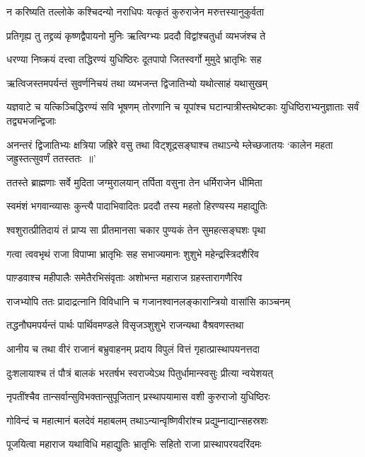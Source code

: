 \twolineshloka
{न करिष्यति तल्लोके कश्चिदन्यो नराधिपः}
{यत्कृतं कुरुराजेन मरुत्तस्यानुकुर्वता}


\twolineshloka
{प्रतिगृह्य तु तद्द्रव्यं कृष्णद्वैपायनो मुनिः}
{ऋत्विग्भ्यः प्रददौ विद्वांश्चतुर्धा व्यभजंश्च ते}


\twolineshloka
{धरण्या निष्क्रयं दत्त्वा तद्धिरण्यं युधिष्ठिरः}
{दूतपापो जितस्वर्गो मुमुदे भ्रातृभिः सह}


\twolineshloka
{ऋत्विजस्तमपर्यन्तं सुवर्णनिचयं तथा}
{व्यभजन्त द्विजातिभ्यो यथोत्साहं यथासुखम्}


\threelineshloka
{यज्ञवाटे च यत्किञ्चिद्धिरण्यं सवि भूषणम्}
{तोरणानि च यूपांश्च घटान्पात्रीस्तथेष्टकाः}
{युधिष्ठिराभ्यनुज्ञाताः सर्वं तद्व्यभजन्द्विजाः}


\threelineshloka
{अनन्तरं द्विजातिभ्यः क्षत्रिया जह्रिरे वसु}
{तथा विट्शूद्रसङ्घाश्च तथाऽन्ये म्लेच्छजातयः}
{`कालेन महता जह्रुस्तत्सुवर्णं ततस्ततः ॥'}


\twolineshloka
{ततस्ते ब्राह्मणाः सर्वे मुदिता जग्मुरालयान्}
{तर्पिता वसुना तेन धर्मिराजेन धीमिता}


\twolineshloka
{स्वमंशं भगवान्व्यासः कुन्त्यै पादाभिवादितः}
{प्रददौ तस्य महतो हिरण्यस्य महाद्युतिः}


\twolineshloka
{श्वशुरात्प्रीतिदायं तं प्राप्य सा प्रीतमानसा}
{चकार पुण्यकं तेन सुमहत्सङ्घशः पृथा}


\twolineshloka
{गत्वा त्ववभृथं राजा विपाप्मा भ्रातृभिः सह}
{सभाज्यमानः शुशुभे महेन्द्रस्त्रिदशैरिव}


\twolineshloka
{पाण़्डवाश्च महीपालैः समेतैरभिसंवृताः}
{अशोभन्त महाराज ग्रहस्तारागणैरिव}


\twolineshloka
{राजभ्योपि ततः प्रादाद्रत्नानि विविधानि च}
{गजानश्वानलङ्कारान्त्रियो वासांसि काञ्चनम्}


\twolineshloka
{तद्धनौघमपर्यन्तं पार्थः पार्थिवमण्डले}
{विसृजञ्शुशुभे राजन्यथा वैश्रवणस्तथा}


\twolineshloka
{आनीय च तथा वीरं राजानं बभ्रुवाहनम्}
{प्रदाय विपुलं वित्तं गृहात्प्रास्थापयनत्तदा}


\twolineshloka
{दुःशलायाश्च तं पौत्रं बालकं भरतर्षभ}
{स्वराज्येऽथ पितुर्धामान्स्वसुः प्रीत्या न्वयेशयत्}


\twolineshloka
{नृपतींश्चैव तान्सर्वान्सुविभक्तान्सुपूजितान्}
{प्रस्थापयामास वशी कुरुराजो युधिष्ठिरः}


\twolineshloka
{गोविन्दं च महात्मानं बलदेवं महाबलम्}
{तथाऽन्यान्वृष्णिवीरांश्च प्रद्युम्नाद्यान्सहस्रशः}


\twolineshloka
{पूजयित्वा महाराज यथाविधि महाद्युतिः}
{भ्रातृभिः सहितो राजा प्रास्थापरयदरिंदमः}


